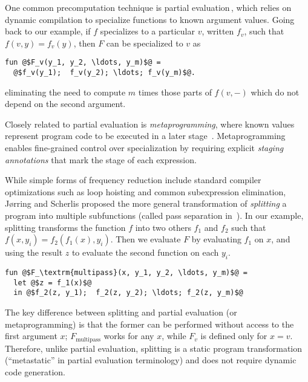 One common precomputation technique is partial
evaluation\,\cite{futamura71,jones96}, which relies on dynamic
compilation to specialize functions to known argument values. Going
back to our example, if $f$ specializes to a particular $v$, written
$f_v$, such that $f(v,y) = f_v(y)$, then $F$ can be specialized to $v$
as
\begin{lstlisting}
fun @$F_v(y_1, y_2, \ldots, y_m)$@ = 
  @$f_v(y_1);  f_v(y_2); \ldots; f_v(y_m)$@.
\end{lstlisting}
eliminating the need to compute $m$ times those parts of $f(v,-)$
which do not depend on the second argument.

Closely related to partial evaluation is {\em metaprogramming}, where
known values represent program code to be executed in a later stage
\,\cite{davies96,Taha97,DP01-modal,NP05-nn}. Metaprogramming enables
fine-grained control over specialization by requiring explicit
\emph{staging annotations} that mark the stage of each expression.




While simple forms of frequency reduction include standard compiler
optimizations such as loop hoisting and common subexpression
elimination, J{\o}rring and Scherlis proposed the more general
transformation of {\em splitting} a program into multiple subfunctions
(called pass separation in \,\cite{JS86-staging}). In our example,
splitting transforms the function $f$ into two others $f_1$ and $f_2$
such that $f(x,y_i) = f_2(f_1(x),y_i)$. Then we evaluate $F$ by
evaluating $f_1$ on $x$, and using the result $z$ to evaluate
the second function on each $y_i$.
%
\begin{lstlisting}
fun @$F_\textrm{multipass}(x, y_1, y_2, \ldots, y_m)$@ = 
  let @$z = f_1(x)$@
  in @$f_2(z, y_1);  f_2(z, y_2); \ldots; f_2(z, y_m)$@
\end{lstlisting}
%
The key difference between splitting and partial evaluation (or
metaprogramming) is that the former can be performed without access to
the first argument $x$; $F_\textrm{multipass}$ works for any $x$,
while $F_v$ is defined only for $x=v$.  Therefore, unlike partial
evaluation, splitting is a static program transformation
(``metastatic'' in partial evaluation terminology) and does not require
dynamic code generation.


